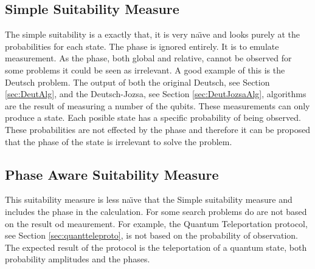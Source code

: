 \subsection{Simple Suitability Measure}
\label{sec:simplsuitmeas}
The simple suitability is a exactly that, it is very na\"{\i}ve and looks purely at the probabilities for each state.
The phase is ignored entirely.
It is to emulate measurement.
As the phase, both global and relative, cannot be observed for some problems it could be seen as irrelevant.
A good example of this is the Deutsch problem.
The output of both the original Deutsch, see Section \ref{sec:DeutAlg}, and the Deutsch-Jozsa, see Section \ref{sec:DeutJozsaAlg}, algorithms are the result of measuring a number of the qubits.
These measurements can only produce a state.
Each posible state has a specific probability of being observed.
These probabilities are not effected by the phase and therefore it can be proposed that the phase of the state is irrelevant to solve the problem.

\subsection{Phase Aware Suitability Measure}
\label{sec:phaseawaresuitmeas}
This suitability measure is less na\"{\i}ve that the Simple suitability measure and includes the phase in the calculation.
For some search problems do are not based on the result od meaurement.
For example, the Quantum Teleportation protocol, see Section \ref{sec:quantteleproto}, is not based on the probability of observation.
The expected result of the protocol is the teleportation of a quantum state, both probability amplitudes and the phases.

